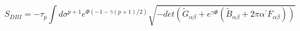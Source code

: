\begin{equation}
S_{DBI}=-\tau_p\int
d\sigma^{p+1}e^{\Phi(-1-\gamma(p+1)/2)}\sqrt{-det(\tilde
G_{\alpha\beta}+e^{\gamma\Phi}(\tilde
B_{\alpha\beta}+2\pi\alpha^\prime F_{\alpha\beta}))} \label{DBI}
\end{equation}

